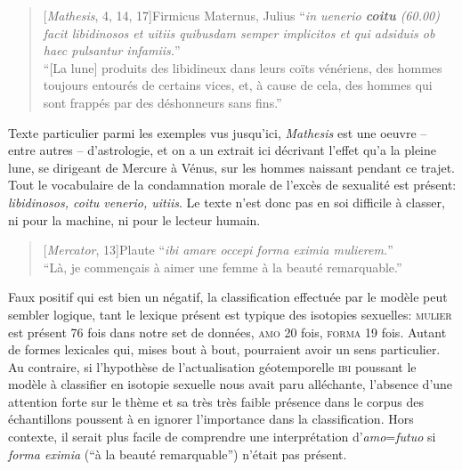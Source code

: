 \begin{quote}[\textit{Mathesis}, 4, 14, 17]{Firmicus Maternus, Julius}
    \enquote{\textit{in uenerio \textbf{coitu} (60.00) facit libidinosos et uitiis quibusdam semper implicitos et qui adsiduis ob haec pulsantur infamiis.}} \\
    \enquote{[La lune] produits des libidineux dans leurs coïts vénériens, des hommes toujours entourés de certains vices, et, à cause de cela, des hommes qui sont frappés par des déshonneurs sans fins.}
\end{quote}

Texte particulier parmi les exemples vus jusqu'ici, \textit{Mathesis} est une oeuvre -- entre autres -- d'astrologie, et on a un extrait ici décrivant l'effet qu'a la pleine lune, se dirigeant de Mercure à Vénus, sur les hommes naissant pendant ce trajet. Tout le vocabulaire de la condamnation morale de l'excès de sexualité est présent: \textit{libidinosos, coitu venerio, uitiis}. %
Le texte n'est donc pas en soi difficile à classer, ni pour la machine, ni pour le lecteur humain.

\starbreak

\begin{quote}[\textit{Mercator}, 13]{Plaute}
    \enquote{\textit{ibi amare occepi forma eximia mulierem.}} \\
    \enquote{Là, je commençais à aimer une femme à la beauté remarquable.}
\end{quote}

Faux positif qui est bien un négatif, la classification effectuée par le modèle peut sembler logique, tant le lexique présent est typique des isotopies sexuelles: \textsc{mulier} est présent 76 fois dans notre set de données, \textsc{amo} 20 fois, \textsc{forma} 19 fois. Autant de formes lexicales qui, mises bout à bout, pourraient avoir un sens particulier. Au contraire, si l'hypothèse de l'actualisation géotemporelle \textsc{ibi} poussant le modèle à classifier en isotopie sexuelle nous avait paru alléchante, l'absence d'une attention forte sur le thème et sa très très faible présence dans le corpus des échantillons poussent à en ignorer l'importance dans la classification. Hors contexte, il serait plus facile de comprendre une interprétation d'\textit{amo}=\textit{futuo} si \textit{forma eximia} (\enquote{à la beauté remarquable}) n'était pas présent.

